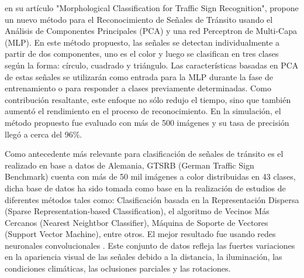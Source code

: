 		\citep{Hai2014} en su artículo "Morphological Classification for Traffic Sign Recognition", propone un nuevo método para el Reconocimiento de Señales de Tránsito usando el Análisis de Componentes Principales (PCA) y una red Perceptron de Multi-Capa (MLP). En este método propuesto, las señales se detectan individualmente a partir de dos componentes, uno es el color y luego se clasifican en tres clases según la forma: círculo, cuadrado y triángulo. Las características basadas en PCA de estas señales se utilizarán como entrada para la MLP durante la fase de entrenamiento o para responder a clases previamente determinadas. Como contribución resaltante, este enfoque no sólo redujo el tiempo, sino que también aumentó el rendimiento en el proceso de reconocimiento. En la simulación, el método propuesto fue evaluado con más de 500 imágenes y su tasa de precisión llegó a cerca del 96\%. 

		\vskip 0.4cm	
		Como antecedente más relevante para clasificación de señales de tránsito es el realizado en base a datos de Alemania, GTSRB (German Traffic Sign Benchmark) cuenta con más de 50 mil imágenes a color distribuidas en 43 clases, dicha base de datos ha sido tomada como base en la realización de estudios de diferentes métodos tales como: Clasificación basada en la Representación Dispersa (Sparse Representation-based Classification), el algoritmo de Vecinos Más Cercanos (Nearest Neightbor Classifier), Máquina de Soporte de Vectores (Support Vector Machine), entre otros. El mejor resultado fue usando redes neuronales convolucionales \citep{Ciresan}.
		Este conjunto de datos refleja las fuertes variaciones en la apariencia visual de las señales debido a la distancia, la iluminación, las condiciones climáticas, las oclusiones parciales y las rotaciones. %
		\vskip 0.4cm

